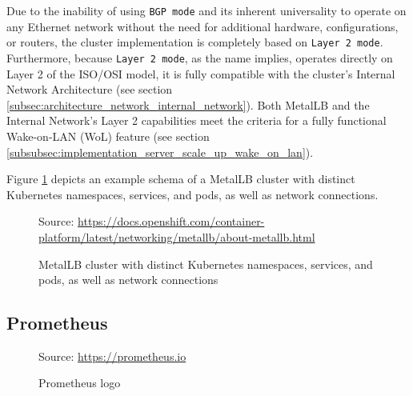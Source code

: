 Due to the inability of using \texttt{BGP mode} and its inherent universality to
operate on any Ethernet network without the need for additional hardware, configurations,
or routers, the cluster implementation is completely based on \texttt{Layer 2 mode}.
Furthermore, because \texttt{Layer 2 mode}, as the name implies, operates directly
on Layer 2 of the ISO/OSI model, it is fully compatible with the cluster's
Internal Network Architecture (see section \ref{subsec:architecture_network_internal_network}).
Both MetalLB and the Internal Network's Layer 2 capabilities meet the criteria for
a fully functional Wake-on-LAN (WoL) feature (see section
\ref{subsubsec:implementation_server_scale_up_wake_on_lan}).

Figure \ref{fig:metallb} depicts an example schema of a MetalLB cluster with distinct
Kubernetes namespaces, services, and pods, as well as network connections.

\begin{figure}[htbp]
  \centering
  \def\stackalignment{r} %
  {\scriptsize Source: \url{https://docs.openshift.com/container-platform/latest/networking/metallb/about-metallb.html} }
  \caption{MetalLB
  cluster
  with
  distinct
  Kubernetes
  namespaces,
  services,
  and
  pods,
  as
  well
  as
  network
  connections}
  \label{fig:metallb}
\end{figure}

\subsection{Prometheus}
\label{subsec:implementation_dependencies_prometheus}

\begin{figure} %
  \centering
  \def\stackalignment{l} %
  {\scriptsize \parbox[t]{\linewidth}{ Source: \url{https://prometheus.io}} }
  \caption{Prometheus logo}
\end{figure}

